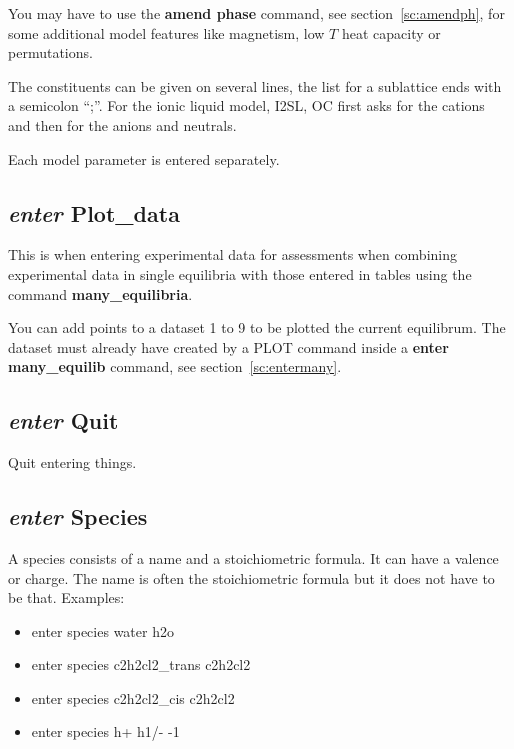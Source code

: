 \documentclass[11pt]{article}
\begin{document}
You may have to use the {\bf amend phase} command, see
section~\ref{sc:amendph}, for some additional model features like
magnetism, low $T$ heat capacity or permutations.

The constituents can be given on several lines, the list for a
sublattice ends with a semicolon ``;''.  For the
ionic liquid model, I2SL, OC first asks for the cations and then for
the anions and neutrals.

Each model parameter is entered separately.

\hypertarget{Enter plot data}{}
\subsection{{\em enter} Plot\_data}

This is when entering experimental data for assessments when combining
experimental data in single equilibria with those entered in tables
using the command {\bf many\_equilibria}.

You can add points to a dataset 1 to 9 to be plotted the current
equilibrum.  The dataset must already have created by a PLOT command
inside a {\bf enter many\_equilib} command, see
section~\ref{sc:entermany}.

\hypertarget{Enter quit}{}
\subsection{{\em enter} Quit}

Quit entering things.

\hypertarget{Enter species}{}
\subsection{{\em enter} Species}\label{sc:entersp}

A species consists of a name and a stoichiometric formula.  It can have
a valence or charge.  The name is often the stoichiometric formula
but it does not have to be that.  Examples:

\begin{itemize}
\item enter species water h2o
\item enter species c2h2cl2\_trans c2h2cl2
\item enter species c2h2cl2\_cis c2h2cl2
\item enter species h+ h1/- -1
\end{itemize}
\end{document}
